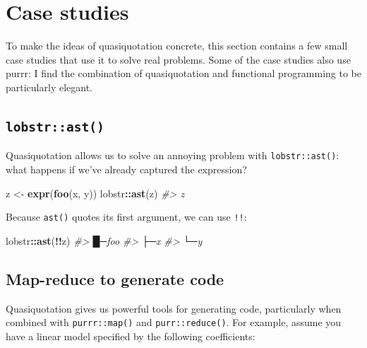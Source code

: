 \documentclass[]{book}
\newenvironment{Shaded}{\begin{snugshade}}{\end{snugshade}}
\newcommand{\CommentTok}[1]{\textcolor[rgb]{0.37,0.37,0.37}{\textit{#1}}}
\newcommand{\KeywordTok}[1]{\textcolor[rgb]{0.27,0.27,0.27}{\textbf{#1}}}
\newcommand{\NormalTok}[1]{#1}
\newcommand{\OperatorTok}[1]{\textcolor[rgb]{0.43,0.43,0.43}{\textbf{#1}}}
\newcommand{\StringTok}[1]{\textcolor[rgb]{0.5,0.5,0.5}{#1}}
\begin{document}
\hypertarget{expr-case-studies}{%
\section{Case studies}\label{expr-case-studies}}

To make the ideas of quasiquotation concrete, this section contains a few small case studies that use it to solve real problems. Some of the case studies also use purrr: I find the combination of quasiquotation and functional programming to be particularly elegant.

\hypertarget{lobstrast}{%
\subsection{\texorpdfstring{\texttt{lobstr::ast()}}{lobstr::ast()}}\label{lobstrast}}


Quasiquotation allows us to solve an annoying problem with \texttt{lobstr::ast()}: what happens if we've already captured the expression?

\begin{Shaded}
\begin{Highlighting}[]
\NormalTok{z <-}\StringTok{ }\KeywordTok{expr}\NormalTok{(}\KeywordTok{foo}\NormalTok{(x, y))}
\NormalTok{lobstr}\OperatorTok{::}\KeywordTok{ast}\NormalTok{(z)}
\CommentTok{#> z}
\end{Highlighting}
\end{Shaded}

Because \texttt{ast()} quotes its first argument, we can use \texttt{!!}:

\begin{Shaded}
\begin{Highlighting}[]
\NormalTok{lobstr}\OperatorTok{::}\KeywordTok{ast}\NormalTok{(}\OperatorTok{!!}\NormalTok{z)}
\CommentTok{#> █─foo }
\CommentTok{#> ├─x }
\CommentTok{#> └─y}
\end{Highlighting}
\end{Shaded}

\hypertarget{map-reduce-to-generate-code}{%
\subsection{Map-reduce to generate code}\label{map-reduce-to-generate-code}}

Quasiquotation gives us powerful tools for generating code, particularly when combined with \texttt{purrr::map()} and \texttt{purr::reduce()}. For example, assume you have a linear model specified by the following coefficients:
\end{document}
